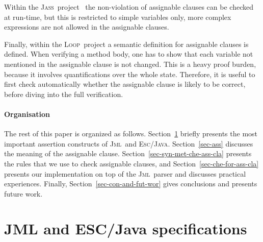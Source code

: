\documentclass[a4paper]{llncs}
\newcommand{\jml}{\textsc{Jml}}
\newcommand{\escj}{\textsc{Esc/Java}}
\newcommand{\jass}{\textsc{Jass}}
\newcommand{\loopp}{\textsc{Loop}}
\newcommand{\java}{\textsc{Java}}
\newcommand{\csrc}{\textsc{Compaq Src}}
\begin{document}
Within the \jass\ project~\cite{JassUrl} the non-violation of assignable
clauses can be checked at run-time, but this is restricted to simple
variables only, more complex expressions are not allowed in the
assignable clauses.

Finally, within the \loopp\ project a semantic definition for
assignable clauses is defined. When verifying a method body, one has
to show that each variable not mentioned in the assignable clause is
not changed. This is a heavy proof burden, because it involves
quantifications over the whole state. Therefore, it is useful to first 
check automatically whether the assignable clause is likely to be
correct, before diving into the full verification.

\paragraph{\bf{Organisation}}

The rest of this paper is organized as follows.
Section~\ref{sec-esc-prg} briefly presents the most important
assertion constructs of \jml\ and \escj. Section~\ref{sec-ass}
discusses the meaning of the assignable clause.
Section~\ref{sec-syn-met-che-ass-cla} presents the rules that we use
to check assignable clauses, and Section~\ref{sec-che-for-ass-cla}
presents our implementation on top of the \jml\ parser and discusses
practical experiences.  Finally, Section~\ref{sec-con-and-fut-wor}
gives conclusions and presents future work.






\section{JML and ESC/Java specifications}
\label{sec-esc-prg}
\end{document}
